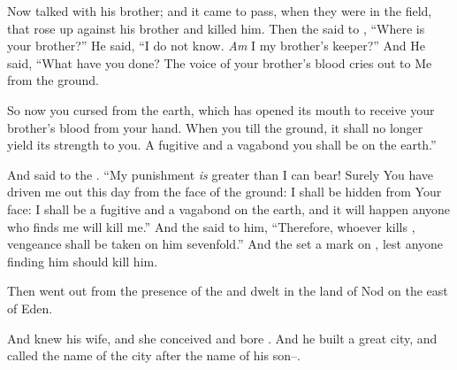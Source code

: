 \bverse Now \Cain talked with \Abel his brother; and it came to pass, when they were in the field, that \Cain rose up against \Abel his brother and killed him.
\bverse Then the \lord said to \Cain, ``Where is \Abel your brother?'' He said, ``I do not know. \textit{Am} I my brother's keeper?''
\bverse And He said, ``What have you done? The voice of your brother's blood cries out to Me from the ground.

\bverse So now you \are cursed from the earth, which has opened its mouth to receive your brother's blood from your hand.
\bverse When you till the ground, it shall no longer yield its strength to you. A fugitive and a vagabond you shall be on the earth.''
	
\bverse And \Cain said to the \lord. ``My punishment \textit{is} greater than I can bear!
\bverse Surely You have driven me out this day from the face of the ground: I shall be hidden from Your face: I shall be a fugitive and a vagabond on the earth, and it will happen \that anyone who finds me will kill me.''
\bverse And the \lord said to him, ``Therefore, whoever kills \Cain, vengeance shall be taken on him sevenfold.'' And the \lord set a mark on \Cain, lest anyone finding him should kill him.


\bverse Then \Cain went out from the presence of the \lord and dwelt in the land of Nod on the east of Eden.

\bverse And \Cain knew his wife, and she conceived and bore . And he built a great city, and called the name of the city after the name of his son--.
	
